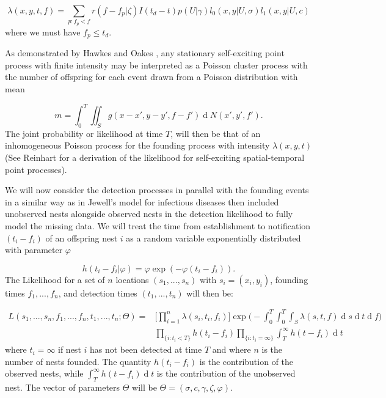 \documentclass[11pt,a4paper]{article}
\renewcommand{\d}[1]{\ensuremath{\operatorname{d}\!{#1}}}
\begin{document}
\begin{equation*}
    \lambda(x, y, t, f) = \sum_{p:f_p < f} r(f - f_p | \zeta) I(t_d - t) p(U | \gamma) l_0(x, y | U, \sigma) l_1(x, y | U, c)
\end{equation*}
where we must have $f_p\leq t_d$.

As demonstrated by Hawkes and Oakes \cite{Hawkes74}, any stationary self-exciting point process with finite intensity may be interpreted as a Poisson cluster process with the number of offspring for each event drawn from a Poisson distribution with mean 

\begin{equation} \label{eq:NumOffsp}
    m = \int_0^T \iint_S g(x-x', y-y', f-f')\d N(x', y', f').
\end{equation}
The joint probability or likelihood at time $T$, will then be that of an inhomogeneous Poisson process for the founding process with intensity $\lambda(x, y, t)$ (See Reinhart \cite{Reinhart} for a derivation of the likelihood for self-exciting spatial-temporal point processes).

We will now consider the detection processes in parallel with the founding events in a similar way as in Jewell's model for infectious diseases \cite{Jewell} then included unobserved nests alongside observed nests in the detection likelihood to fully model the missing data. We will treat the time from establishment to notification $(t_i - f_i)$ of an offspring nest $i$ as a random variable exponentially distributed with parameter $\varphi$

\begin{equation*}
    h(t_{i} - f_{i} | \varphi) = \varphi \exp (- \varphi(t_{i} - f_{i})).
\end{equation*}
The Likelihood for a set of $n$ locations $(s_{1}, ... , s_{n})$ with $s_i = (x_i, y_i)$, founding times $f_{1}, ... , f_{n}$, and detection times $(t_{1},  ... , t_{n})$ will then be:

\begin{equation} \label{eq:like}
    \begin{aligned}
        L(s_{1}, ..., s_{n}, f_{1}, ..., f_{n}, t_{1}, ..., t_{n} ; \Theta) = & \Bigg[ \prod_{i = 1}^{n} \lambda(s_{i}, t_{i}, f_{i}) \Bigg] \exp \Bigg(- \int_{0}^{T} \int_{0}^{T} \int_{S} \lambda(s, t, f) \d s \d t \d f \Bigg) \\ 
        & \prod_{\{ i : t_{i} < T \} } h(t_{i} - f_{i}) \prod_{ \{ i : t_{i} = \infty \} } \int_{T}^{\infty} h(t - f_{i}) \d t
    \end{aligned}
\end{equation}
where $t_{i} = \infty$ if nest $i$ has not been detected at time $T$ and where $n$ is the number of nests founded. The quantity $h(t_{i} - f_{i})$ is the contribution of the observed nests, while $\int_{T}^{\infty} h(t - f_{i}) \d t$ is the contribution of the unobserved nest. The vector of parameters $\Theta$ will be $\Theta = ( \sigma, c, \gamma, \zeta, \varphi)$.
\end{document}
